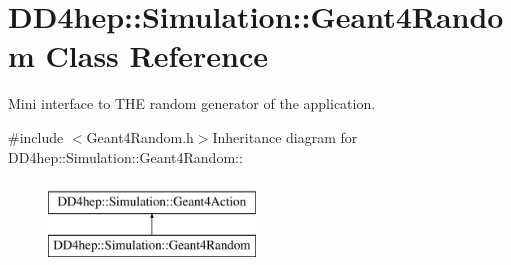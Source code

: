 \hypertarget{class_d_d4hep_1_1_simulation_1_1_geant4_random}{
\section{DD4hep::Simulation::Geant4Random Class Reference}
\label{class_d_d4hep_1_1_simulation_1_1_geant4_random}
}


Mini interface to THE random generator of the application.  


{\ttfamily \#include $<$Geant4Random.h$>$}Inheritance diagram for DD4hep::Simulation::Geant4Random::\begin{figure}[H]
\begin{center}
\leavevmode
\includegraphics[height=2cm]{class_d_d4hep_1_1_simulation_1_1_geant4_random}
\end{center}
\end{figure}
